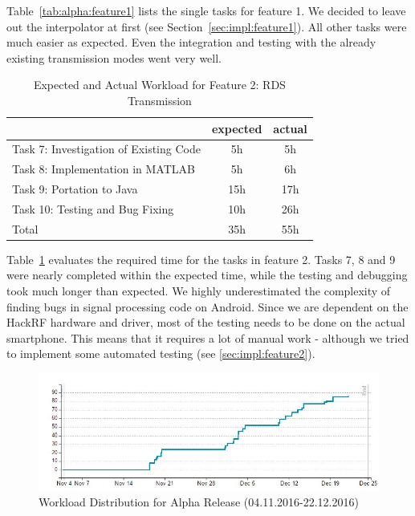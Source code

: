 Table~\ref{tab:alpha:feature1} lists the single tasks for feature 1. We decided to leave out the interpolator at first (see Section~\ref{sec:impl:feature1}). All other tasks were much easier as expected. Even the integration and testing with the already existing transmission modes went very well. 
	
	\begin{table}
		\centering
		\caption{Expected and Actual Workload for Feature 2: RDS Transmission}				\label{tab:alpha:feature2}
		\begin{tabular}{ l | c | c }
			& expected  & actual \\ \hline
			Task 7: Investigation of Existing Code&  5h & 5h \\ \hline
			Task 8: Implementation in MATLAB & 5h & 6h  \\ \hline
			Task 9: Portation to Java & 15h & 17h  \\ \hline
			Task 10: Testing and Bug Fixing & 10h & 26h \\ \hline \hline
			Total & 35h & 55h
		\end{tabular}
	\end{table}
	
	Table~\ref{tab:alpha:feature2} evaluates the required time for the tasks in feature 2. Tasks 7, 8 and 9 were nearly completed within the expected time, while the testing and debugging took much longer than expected. We highly underestimated the complexity of finding bugs in signal processing code on Android. Since we are dependent on the HackRF hardware and driver, most of the testing needs to be done on the actual smartphone. This means that it requires a lot of manual work - although we tried to implement some automated testing (see \ref{sec:impl:feature2}). 
	
	\begin{figure}
		\centering
		\includegraphics[width=1\linewidth]{gfx/Agilefant_Alpha.jpg}
		\caption{Workload Distribution for Alpha Release (04.11.2016-22.12.2016)}
		\label{fig:agilefant_alpha}
	\end{figure}
	
